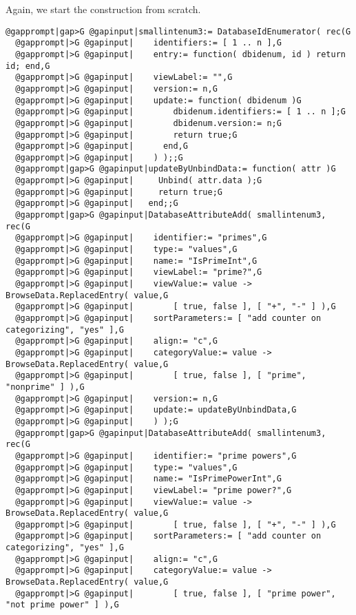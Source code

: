 \documentclass[a4paper,11pt]{report}
\begin{document}
{{ Again, we start the construction from scratch. 
\begin{Verbatim}[commandchars=@|G,fontsize=\small,frame=single,label=Example]
  @gapprompt|gap>G @gapinput|smallintenum3:= DatabaseIdEnumerator( rec(G
  @gapprompt|>G @gapinput|    identifiers:= [ 1 .. n ],G
  @gapprompt|>G @gapinput|    entry:= function( dbidenum, id ) return id; end,G
  @gapprompt|>G @gapinput|    viewLabel:= "",G
  @gapprompt|>G @gapinput|    version:= n,G
  @gapprompt|>G @gapinput|    update:= function( dbidenum )G
  @gapprompt|>G @gapinput|        dbidenum.identifiers:= [ 1 .. n ];G
  @gapprompt|>G @gapinput|        dbidenum.version:= n;G
  @gapprompt|>G @gapinput|        return true;G
  @gapprompt|>G @gapinput|      end,G
  @gapprompt|>G @gapinput|    ) );;G
  @gapprompt|gap>G @gapinput|updateByUnbindData:= function( attr )G
  @gapprompt|>G @gapinput|     Unbind( attr.data );G
  @gapprompt|>G @gapinput|     return true;G
  @gapprompt|>G @gapinput|   end;;G
  @gapprompt|gap>G @gapinput|DatabaseAttributeAdd( smallintenum3, rec(G
  @gapprompt|>G @gapinput|    identifier:= "primes",G
  @gapprompt|>G @gapinput|    type:= "values",G
  @gapprompt|>G @gapinput|    name:= "IsPrimeInt",G
  @gapprompt|>G @gapinput|    viewLabel:= "prime?",G
  @gapprompt|>G @gapinput|    viewValue:= value -> BrowseData.ReplacedEntry( value,G
  @gapprompt|>G @gapinput|        [ true, false ], [ "+", "-" ] ),G
  @gapprompt|>G @gapinput|    sortParameters:= [ "add counter on categorizing", "yes" ],G
  @gapprompt|>G @gapinput|    align:= "c",G
  @gapprompt|>G @gapinput|    categoryValue:= value -> BrowseData.ReplacedEntry( value,G
  @gapprompt|>G @gapinput|        [ true, false ], [ "prime", "nonprime" ] ),G
  @gapprompt|>G @gapinput|    version:= n,G
  @gapprompt|>G @gapinput|    update:= updateByUnbindData,G
  @gapprompt|>G @gapinput|    ) );G
  @gapprompt|gap>G @gapinput|DatabaseAttributeAdd( smallintenum3, rec(G
  @gapprompt|>G @gapinput|    identifier:= "prime powers",G
  @gapprompt|>G @gapinput|    type:= "values",G
  @gapprompt|>G @gapinput|    name:= "IsPrimePowerInt",G
  @gapprompt|>G @gapinput|    viewLabel:= "prime power?",G
  @gapprompt|>G @gapinput|    viewValue:= value -> BrowseData.ReplacedEntry( value,G
  @gapprompt|>G @gapinput|        [ true, false ], [ "+", "-" ] ),G
  @gapprompt|>G @gapinput|    sortParameters:= [ "add counter on categorizing", "yes" ],G
  @gapprompt|>G @gapinput|    align:= "c",G
  @gapprompt|>G @gapinput|    categoryValue:= value -> BrowseData.ReplacedEntry( value,G
  @gapprompt|>G @gapinput|        [ true, false ], [ "prime power", "not prime power" ] ),G

\end{Verbatim}}}
\end{document}
